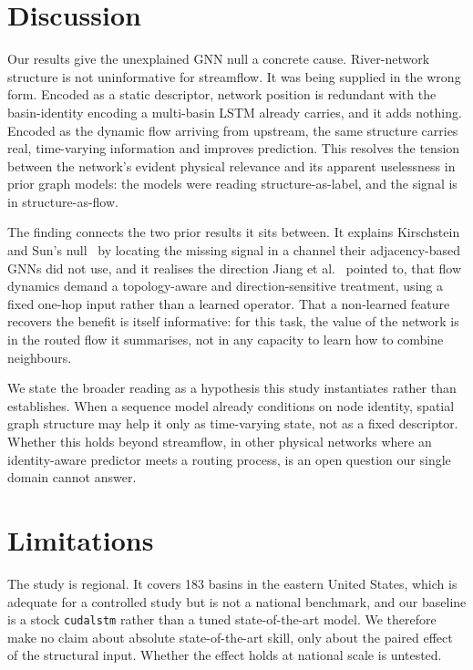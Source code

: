 \documentclass[11pt]{article}
\begin{document}
\section{Discussion}

Our results give the unexplained GNN null a concrete cause. River-network structure is not
uninformative for streamflow. It was being supplied in the wrong form. Encoded as a static
descriptor, network position is redundant with the basin-identity encoding a multi-basin LSTM
already carries, and it adds nothing. Encoded as the dynamic flow arriving from upstream, the same
structure carries real, time-varying information and improves prediction. This resolves the tension
between the network's evident physical relevance and its apparent uselessness in prior graph models:
the models were reading structure-as-label, and the signal is in structure-as-flow.

The finding connects the two prior results it sits between. It explains Kirschstein and Sun's
null~\cite{kirschstein2024} by locating the missing signal in a channel their adjacency-based GNNs
did not use, and it realises the direction Jiang et al.~\cite{jiang2025} pointed to, that flow
dynamics demand a topology-aware and direction-sensitive treatment, using a fixed one-hop input
rather than a learned operator. That a non-learned feature recovers the benefit is itself
informative: for this task, the value of the network is in the routed flow it summarises, not in any
capacity to learn how to combine neighbours.

We state the broader reading as a hypothesis this study instantiates rather than establishes. When a
sequence model already conditions on node identity, spatial graph structure may help it only as
time-varying state, not as a fixed descriptor. Whether this holds beyond streamflow, in other
physical networks where an identity-aware predictor meets a routing process, is an open question our
single domain cannot answer.

\section{Limitations}

The study is regional. It covers 183 basins in the eastern United States, which is adequate for a
controlled study but is not a national benchmark, and our baseline is a stock \texttt{cudalstm}
rather than a tuned state-of-the-art model. We therefore make no claim about absolute
state-of-the-art skill, only about the paired effect of the structural input. Whether the effect
holds at national scale is untested.
\end{document}
